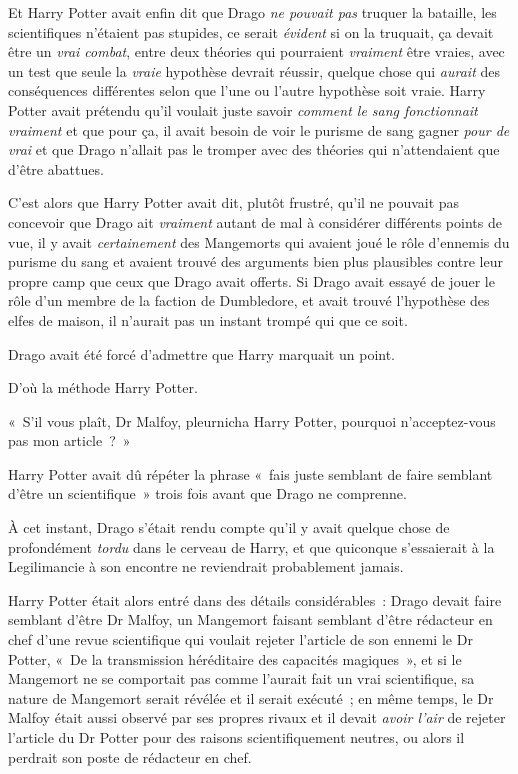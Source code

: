 Et Harry Potter avait enfin dit que Drago \emph{ne pouvait pas} truquer la bataille, les scientifiques n'étaient pas stupides, ce serait \emph{évident} si on la truquait, ça devait être un \emph{vrai combat}, entre deux théories qui pourraient \emph{vraiment} être vraies, avec un test que seule la \emph{vraie} hypothèse devrait réussir, quelque chose qui \emph{aurait} des conséquences différentes selon que l'une ou l'autre hypothèse soit vraie. Harry Potter avait prétendu qu'il voulait juste savoir \emph{comment le sang fonctionnait vraiment} et que pour ça, il avait besoin de voir le purisme de sang gagner \emph{pour de vrai} et que Drago n'allait pas le tromper avec des théories qui n'attendaient que d'être abattues.

C'est alors que Harry Potter avait dit, plutôt frustré, qu'il ne pouvait pas concevoir que Drago ait \emph{vraiment} autant de mal à considérer différents points de vue, il y avait \emph{certainement} des Mangemorts qui avaient joué le rôle d'ennemis du purisme du sang et avaient trouvé des arguments bien plus plausibles contre leur propre camp que ceux que Drago avait offerts. Si Drago avait essayé de jouer le rôle d'un membre de la faction de Dumbledore, et avait trouvé l'hypothèse des elfes de maison, il n'aurait pas un instant trompé qui que ce soit.

Drago avait été forcé d'admettre que Harry marquait un point.

D'où la méthode Harry Potter.

«~S'il vous plaît, Dr Malfoy, pleurnicha Harry Potter, pourquoi n'acceptez-vous pas mon article~?~»

Harry Potter avait dû répéter la phrase «~fais juste semblant de faire semblant d'être un scientifique~» trois fois avant que Drago ne comprenne.

À cet instant, Drago s'était rendu compte qu'il y avait quelque chose de profondément \emph{tordu} dans le cerveau de Harry, et que quiconque s'essaierait à la Legilimancie à son encontre ne reviendrait probablement jamais.

Harry Potter était alors entré dans des détails considérables~: Drago devait faire semblant d'être Dr Malfoy, un Mangemort faisant semblant d'être rédacteur en chef d'une revue scientifique qui voulait rejeter l'article de son ennemi le Dr Potter, «~De la transmission héréditaire des capacités magiques~», et si le Mangemort ne se comportait pas comme l'aurait fait un vrai scientifique, sa nature de Mangemort serait révélée et il serait exécuté~; en même temps, le Dr Malfoy était aussi observé par ses propres rivaux et il devait \emph{avoir l'air} de rejeter l'article du Dr Potter pour des raisons scientifiquement neutres, ou alors il perdrait son poste de rédacteur en chef.

